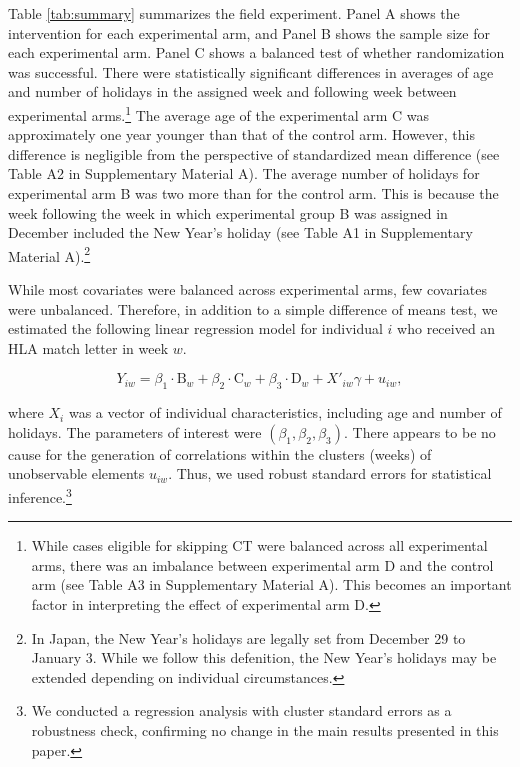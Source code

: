\documentclass[12pt, a4paper]{article}
\begin{document}
Table \ref{tab:summary} summarizes the field experiment. Panel A shows the intervention for each experimental arm, and Panel B shows the sample size for each experimental arm. Panel C shows a balanced test of whether randomization was successful. There were statistically significant differences in averages of age and number of holidays in the assigned week and following week between experimental arms.\footnote{While cases eligible for skipping CT were balanced across all experimental arms, there was an imbalance between experimental arm D and the control arm (see Table A3 in Supplementary Material A). This becomes an important factor in interpreting the effect of experimental arm D.} The average age of the experimental arm C was approximately one year younger than that of the control arm. However, this difference is negligible from the perspective of standardized mean difference (see Table A2 in Supplementary Material A). The average number of holidays for experimental arm B was two more than for the control arm. This is because the week following the week in which experimental group B was assigned in December included the New Year's holiday (see Table A1 in Supplementary Material A).\footnote{In Japan, the New Year's holidays are legally set from December 29 to January 3. While we follow this defenition, the New Year's holidays may be extended depending on individual circumstances.}

While most covariates were balanced across experimental arms, few covariates were unbalanced. Therefore, in addition to a simple difference of means test, we estimated the following linear regression model for individual \(i\) who received an HLA match letter in week \(w\).

\begin{equation}
  Y_{iw} =
  \beta_1 \cdot \text{B}_{w} + \beta_2 \cdot \text{C}_{w} + \beta_3 \cdot \text{D}_{w}
  + X'_{iw} \gamma + u_{iw}, \label{eq:reg}
\end{equation}

\noindent
where \(X_i\) was a vector of individual characteristics, including age and number of holidays. The parameters of interest were \((\beta_1, \beta_2, \beta_3)\). There appears to be no cause for the generation of correlations within the clusters (weeks) of unobservable elements \(u_{iw}\). Thus, we used robust standard errors for statistical inference.\footnote{We conducted a regression analysis with cluster standard errors as a robustness check, confirming no change in the main results presented in this paper.}
\end{document}
